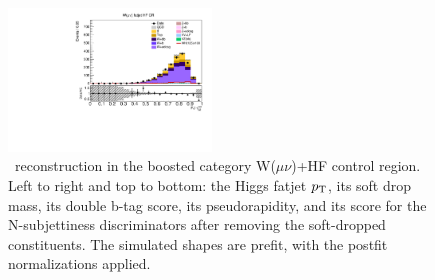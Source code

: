 \begin{figure}[tbp]
\begin{center}
    \includegraphics[width=0.48\textwidth]{figures/wlnhbb2016/boosted/WmnWHHeavyFlavorFJCR_fj1Tau32SD.pdf}
    \caption{\HBB\ reconstruction in the boosted category W($\mu\nu$)+HF control region.
    Left to right and top to bottom: the Higgs fatjet $p_{\mathrm{T}}$, its soft drop mass, its
    double b-tag score, its pseudorapidity, and its score for the N-subjettiness discriminators
    after removing the soft-dropped constituents.
    The simulated shapes are prefit, with the postfit normalizations applied.}
    \label{fig:boost_WmnHF_Hbb}
  \end{center}
\end{figure}
\clearpage

